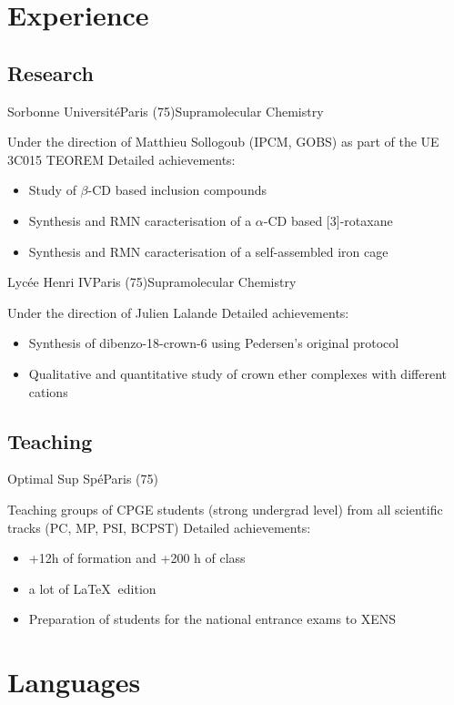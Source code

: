 \documentclass[11pt,a4paper,sans]{moderncv}
\begin{document}
\section{Experience}
%
%
\subsection{Research}
%
%
%
{Sorbonne Université}{Paris (75)}{Supramolecular Chemistry}%
{Under the direction of Matthieu Sollogoub (IPCM, GOBS) as part of the UE 3C015 TEOREM\newline{}%
Detailed achievements:%
\begin{itemize}%
\item Study of $\beta$-CD based inclusion compounds
\item Synthesis and RMN caracterisation of a $\alpha$-CD based [3]-rotaxane
\item Synthesis and RMN caracterisation of a self-assembled iron cage
\end{itemize}
}
%
%
%
{Lycée Henri IV}{Paris (75)}{Supramolecular Chemistry}%
{Under the direction of Julien Lalande \newline{}%
Detailed achievements:%
\begin{itemize}%
\item Synthesis of dibenzo-18-crown-6 using Pedersen's original protocol
\item Qualitative and quantitative study of crown ether complexes with different cations
\end{itemize}
}
%
%
%
\subsection{Teaching}
%
{Optimal Sup Spé}{Paris (75)}{}%
{Teaching groups of CPGE students (strong undergrad level) from all scientific tracks (PC, MP, PSI, BCPST)\newline{}%
Detailed achievements:%
\begin{itemize}%
\item +12h of formation and +200 h of class
\item a lot of {\LaTeX} $~$edition
\item Preparation of students for the national entrance exams to XENS
\end{itemize}
}
%
%
%
\section{Languages}
%
%
%
\end{document}

